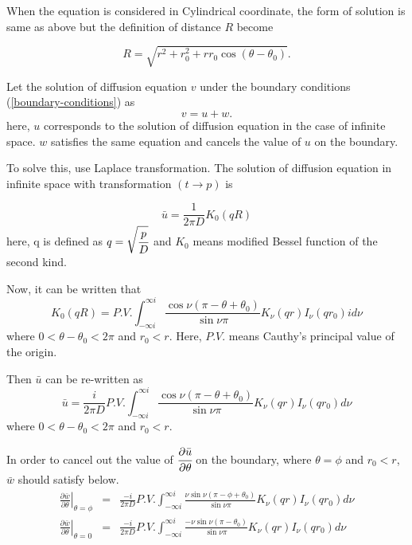 \documentclass{article}
\begin{document}
When the equation is considered in Cylindrical coordinate, the form of solution
 is same as above but the definition of distance $R$ become

\begin{equation}
    R = \sqrt{r^2+r_0^2+rr_0\cos(\theta - \theta_0)}.
\end{equation}

Let the solution of diffusion equation $v$ under the boundary conditions
 (\ref{boundary-conditions}) as
\begin{equation}
    v = u + w.
\end{equation}
here, $u$ corresponds to the solution of diffusion equation in the case of
 infinite space. $w$ satisfies the same equation and cancels the value of $u$ on
 the boundary.

To solve this, use Laplace transformation.
 The solution of diffusion equation in infinite space with transformation
 $(t\rightarrow p)$ is

\begin{equation} \label{Laplace-u-solution-infinite}
    \bar{u} = \frac{1}{2\pi D}K_0(qR)
\end{equation}
here, q is defined as $q = \sqrt{\cfrac{p}{D}}$ and $K_0$ means modified Bessel
 function of the second kind.

Now, it can be written that
\begin{equation}\label{expansion-K0}
    K_0(qR) = P.V.\int^{\infty i}_{-\infty i}
              \frac{\cos\nu (\pi - \theta + \theta_0)}{\sin\nu\pi}
              K_\nu(qr)I_\nu(qr_0)id\nu
\end{equation}
where $0 < \theta - \theta_0 < 2\pi$ and $r_0 < r$.
 Here, $P.V.$ means Cauthy's principal value of the origin.

Then $\bar{u}$ can be re-written as
\begin{equation}\label{expansion-bar-u}
    \bar{u} = \frac{i}{2\pi D}P.V.\int^{\infty i}_{-\infty i}
              \frac{\cos\nu (\pi - \theta + \theta_0)}{\sin\nu\pi}
              K_\nu(qr)I_\nu(qr_0)d\nu
\end{equation}
where $0 < \theta - \theta_0 < 2\pi$ and $r_0 < r$.

In order to cancel out the value of $\cfrac{\partial\bar{u}}{\partial\theta}$ on the boundary,
 where $\theta = \phi$ and $r_0 < r$, $\bar{w}$ should satisfy below.
\begin{eqnarray}
    \left.\frac{\partial\bar{w}}{\partial\theta}\right|_{\theta = \phi}
    &=& \frac{-i}{2\pi D}P.V.\int^{\infty i}_{-\infty i}
              \frac{\nu\sin\nu(\pi - \phi + \theta_0)}{\sin\nu\pi}
              K_\nu(qr)I_\nu(qr_0)d\nu\label{boundary-value-phi}\\
    \left.\frac{\partial\bar{w}}{\partial\theta}\right|_{\theta = 0}
    &=& \frac{-i}{2\pi D}P.V.\int^{\infty i}_{-\infty i}
              \frac{-\nu\sin\nu(\pi - \theta_0)}{\sin\nu\pi}
              K_\nu(qr)I_\nu(qr_0)d\nu \label{boundary-value-zero}
\end{eqnarray}
\end{document}
